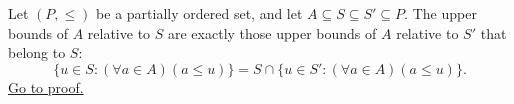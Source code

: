 \begin{proposition}
\label{prop:upper-bounds-ambient-order}
Let $(P,\leq)$ be a partially ordered set, and let
$A\subseteq S\subseteq S'\subseteq P$.  The upper bounds of $A$ relative to
$S$ are exactly those upper bounds of $A$ relative to $S'$ that belong to $S$:
\[
  \{u\in S:(\forall a\in A)(a\leq u)\}
  =
  S\cap\{u\in S':(\forall a\in A)(a\leq u)\}.
\]
\hyperref[prf:upper-bounds-ambient-order]{Go to proof.}
\end{proposition}